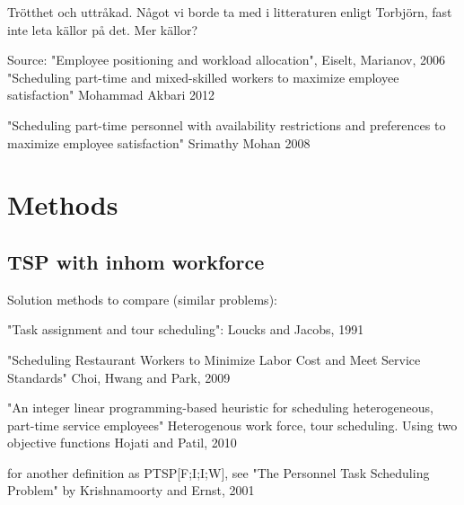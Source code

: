 Trötthet och uttråkad. Något vi borde ta med i litteraturen enligt Torbjörn, fast inte leta källor på det. Mer källor?


Source: "Employee positioning and workload allocation", Eiselt, Marianov, 2006
"Scheduling part-time and mixed-skilled workers to maximize employee satisfaction" Mohammad Akbari 2012

"Scheduling part-time personnel with availability restrictions and preferences to maximize employee satisfaction" Srimathy Mohan 2008


\section{Methods}
\subsection{TSP with inhom workforce}

Solution methods to compare (similar problems):

"Task assignment and tour scheduling": Loucks and Jacobs, 1991


"Scheduling Restaurant Workers to Minimize Labor Cost and Meet Service Standards" Choi, Hwang and Park, 2009

"An integer linear programming-based heuristic for scheduling heterogeneous, part-time service employees" Heterogenous work force, tour scheduling. Using two objective functions Hojati and Patil, 2010

for another definition as PTSP[F;I;I;W], see "The Personnel Task Scheduling Problem" by Krishnamoorty and Ernst, 2001



